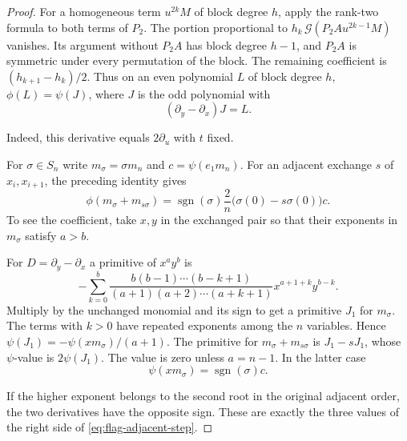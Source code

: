 \begin{proof}
For a
homogeneous term \(u^{2k}M\) of block degree \(h\),
apply the rank-two formula to both terms of \(P_2\).
The portion proportional to
\(h_k\,\mathcal G(P_2 A u^{2k-1}M)\) vanishes. Its
argument without \(P_2 A\) has block degree \(h-1\),
and \(P_2 A\) is symmetric under every permutation of
the block. The remaining coefficient is
\((h_{k+1}-h_k)/2\). Thus on an even polynomial \(L\)
of block degree \(h\), \(\phi(L)=\psi(J)\), where
\(J\) is the odd polynomial with
\[
 (\partial_y-\partial_x)J=L.
\]

Indeed, this derivative equals \(2\partial_u\) with
\(t\) fixed.

For \(\sigma\in S_n\) write \(m_\sigma=\sigma m_n\)
and \(c=\psi(e_1m_n)\). For an adjacent exchange \(s\)
of \(x_i,x_{i+1}\), the preceding identity gives
\begin{equation}\label{eq:flag-adjacent-step}
 \phi(m_\sigma+m_{s\sigma})=
 \operatorname{sgn}(\sigma)\frac{2}{n}
       \bigl(\sigma(0)-s\sigma(0)\bigr)c .
\end{equation}
To see the coefficient, take \(x,y\) in the exchanged pair
so that their exponents in \(m_\sigma\) satisfy \(a>b\).

For \(D=\partial_y-\partial_x\) a primitive of
\(x^a y^b\) is
\[
 -\sum_{k=0}^{b}
 \frac{b(b-1)\cdots(b-k+1)}
 {(a+1)(a+2)\cdots(a+k+1)}x^{a+1+k}y^{b-k}.
\]
Multiply by the unchanged monomial and its sign to get a
primitive \(J_1\) for \(m_\sigma\). The terms with
\(k>0\) have repeated exponents among the \(n\) variables.
Hence \(\psi(J_1)=-\psi(xm_\sigma)/(a+1)\). The
primitive for \(m_\sigma+m_{s\sigma}\) is \(J_1-sJ_1\),
whose \(\psi\)-value is \(2\psi(J_1)\). The value is
zero unless \(a=n-1\). In the latter case
\[
 \psi(xm_\sigma)=\operatorname{sgn}(\sigma)c.
\]

If the higher exponent belongs to the second root in the
original adjacent order, the two derivatives have the
opposite sign. These are exactly the three values of the
right side of \eqref{eq:flag-adjacent-step}.


\end{proof}
